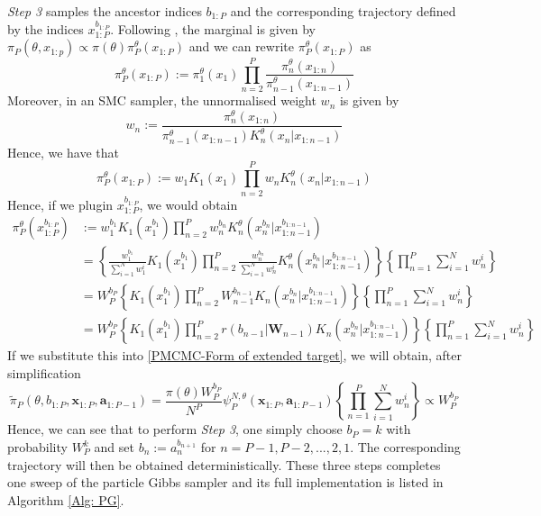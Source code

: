 \documentclass[12pt,a4paper]{article}
\begin{document}
\textit{Step 3} samples the ancestor indices \(b_{1:P}\) and the corresponding trajectory defined by the indices \(x_{1:P}^{b_{1:P}}\). Following \cite[Chapter~5]{lindsten2013backward}, the marginal is given by $\pi_P(\theta,x_{1:p}) \propto \pi(\theta)\pi^{\theta}_P(x_{1:P})$ and we can rewrite $\pi^{\theta}_P(x_{1:P})$ as 
\[
    \pi_{P}^{\theta}(x_{1:P}):= \pi_1^{\theta}(x_1) \prod_{n=2}^{P}\frac{\pi_n^{\theta}(x_{1:n})}{\pi_{n-1}^{\theta}(x_{1:n-1})} 
\]
Moreover, in an SMC sampler, the unnormalised weight \(w_n\) is given by 
\[
  w_n := \frac{\pi_n^{\theta}(x_{1:n})}{\pi_{n-1}^{\theta}(x_{1:n-1})K_n^{\theta}(x_n|x_{1:n-1})} 
\]
Hence, we have that 
\[
  \pi_P^{\theta}(x_{1:P}) := w_1K_1(x_1)\prod_{n=2}^{P} w_n K_n^{\theta}(x_n|x_{1:n-1})
\]
Hence, if we plugin \(x_{1:P}^{b_{1:P}}\), we would obtain 
\begin{equation}
    \label{PMCMC-another way of writing piP}
    \begin{split}
        \pi_P^{\theta}(x_{1:P}^{b_{1:P}}) &:= w_1^{b_1} K_1(x_1^{b_1})\prod_{n=2}^{P} w_n^{b_n} K_n^{\theta}(x_n^{b_n}|x_{1:n-1}^{b_{1:n-1}})\\
        &=\left\{\frac{w_1^{b_1}}{\sum_{i=1}^N w_1^i}K_1(x_1^{b_1})\prod_{n=2}^{P} \frac{w_n^{b_n}}{\sum_{i=1}^N w_n^i} K_n^{\theta}(x_n^{b_n}|x_{1:n-1}^{b_{1:n-1}})\right\}\left\{\prod_{n=1}^{P}\sum_{i=1}^N w_n^i\right\} \\
        &= W_P^{b_P}\left\{K_1(x_1^{b_1}) \prod_{n=2}^{P}W_{n-1}^{b_{n-1}}K_n(x_n^{b_n}|x_{1:n-1}^{b_{1:n-1}})\right\}\left\{\prod_{n=1}^{P}\sum_{i=1}^N w_n^i\right\} \\
        &=W_P^{b_P}\left\{K_1(x_1^{b_1}) \prod_{n=2}^{P}r(b_{n-1}|\mathbf{W}_{n-1})K_n(x_n^{b_n}|x_{1:n-1}^{b_{1:n-1}})\right\}\left\{\prod_{n=1}^{P}\sum_{i=1}^N w_n^i\right\}
    \end{split}
\end{equation}
If we substitute this into \eqref{PMCMC-Form of extended target}, we will obtain, after simplification 
\[
    \tilde{\pi}_P(\theta,b_{1:P},\mathbf{x}_{1:P},\mathbf{a}_{1:P-1}) = \frac{\pi(\theta)W_P^{b_P}}{N^P}\psi_P^{N,\theta}(\mathbf{x}_{1:P},\mathbf{a}_{1:P-1})\left\{\prod_{n=1}^{P}\sum_{i=1}^N w_n^i\right\}  \propto W_P^{b_P}
\]
Hence, we can see that to perform \textit{Step 3}, one simply choose \(b_P = k\) with probability \(W_P^k\) and set \(b_{n} := a_{n}^{b_{n+1}}\) for \(n=P-1,P-2,...,2,1\). The corresponding trajectory will then be obtained deterministically. These three steps completes one sweep of the particle Gibbs sampler and its full implementation is listed in Algorithm \ref{Alg: PG}.
\end{document}
